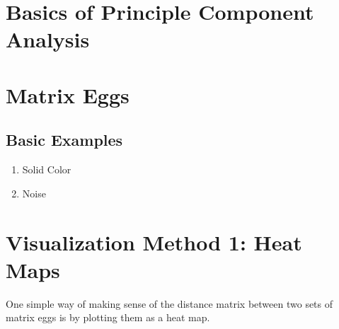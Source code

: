 \section{Basics of Principle Component Analysis}
\section{Matrix Eggs}
\subsection{Basic Examples}
\begin{enumerate}
	\item Solid Color
	\item Noise
\end{enumerate}
\section{Visualization Method 1: Heat Maps}
One simple way of making sense of the distance matrix between two sets of matrix eggs is by plotting them as a heat map.
